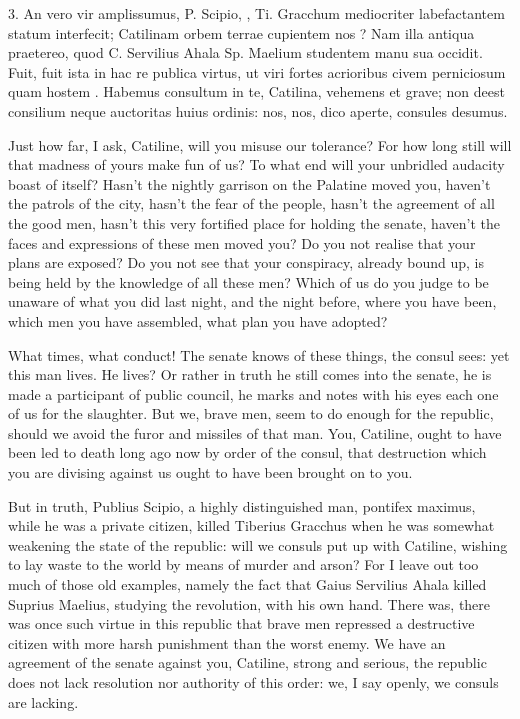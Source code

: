 {  3. An vero vir amplissumus, P. Scipio, , Ti. Gracchum mediocriter labefactantem statum   interfecit; Catilinam orbem terrae   cupientem nos  ? Nam illa  antiqua praetereo, quod C. Servilius Ahala Sp. Maelium  studentem manu sua occidit. Fuit, fuit ista  in hac re publica virtus, ut viri fortes acrioribus  civem perniciosum quam  hostem . Habemus  consultum in te, Catilina, vehemens et grave; non deest  consilium neque auctoritas huius ordinis: nos, nos, dico aperte, consules desumus.
}{
  Just how far, I ask, Catiline, will you misuse our tolerance? For how long still will that madness of yours make fun of us? To what end will your unbridled audacity boast of itself? Hasn’t the nightly garrison on the Palatine moved you, haven’t the patrols of the city, hasn’t the fear of the people, hasn’t the agreement of all the good men, hasn’t this very fortified place for holding the senate, haven’t the faces and expressions of these men moved you? Do you not realise that your plans are exposed? Do you not see that your conspiracy, already bound up, is being held by the knowledge of all these men? Which of us do you judge to be unaware of what you did last night, and the night before, where you have been, which men you have assembled, what plan you have adopted?

  What times, what conduct! The senate knows of these things, the consul sees: yet this man lives. He lives? Or rather in truth he still comes into the senate, he is made a participant of public council, he marks and notes with his eyes each one of us for the slaughter. But we, brave men, seem to do enough for the republic, should we avoid the furor and missiles of that man. You, Catiline, ought to have been led to death long ago now by order of the consul, that destruction which you are divising against us ought to have been brought on to you.

  But in truth, Publius Scipio, a highly distinguished man, pontifex maximus, while he was a private citizen, killed Tiberius Gracchus when he was somewhat weakening the state of the republic: will we consuls put up with Catiline, wishing to lay waste to the world by means of murder and arson? For I leave out too much of those old examples, namely the fact that Gaius Servilius Ahala killed Suprius Maelius, studying the revolution, with his own hand. There was, there was once such virtue in this republic that brave men repressed a destructive citizen with more harsh punishment than the worst enemy. We have an agreement of the senate against you, Catiline, strong and serious, the republic does not lack resolution nor authority of this order: we, I say openly, we consuls are lacking.
}
